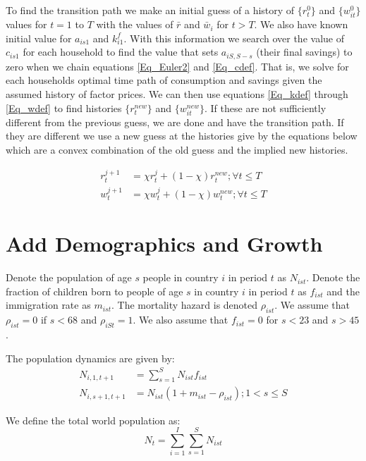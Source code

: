 \documentclass[letterpaper,12pt]{article}
\theoremstyle{definition}
\numberwithin{equation}{section}
\begin{document}
\begin{spacing}{1.5}
	To find the transition path we make an initial guess of a history of $\{r^0_t\}$ and $\{w^0_{it}\}$ values for $t=1$ to $T$ with the values of $\bar r$ and $\bar w_i$ for $t>T$.  We also have  known initial value for $a_{is1}$ and $k^f_{i1}$. With this information we search over the value of $c_{is1}$ for each household to find the value that sets $a_{iS,S-s}$ (their final savings) to zero when we chain equations \eqref{Eq_Euler2} and \eqref{Eq_cdef}.  That is, we solve for each households optimal time path of consumption and savings given the assumed history of factor prices.  We can then use equations \eqref{Eq_kdef} through \eqref{Eq_wdef} to find histories $\{r^{new}_t\}$ and $\{w^{new}_{it}\}$.  If these are not sufficiently different from the previous guess, we are done and have the transition path.  If they are different we use a new guess at the histories give by the equations below which are a convex combination of the old guess and the implied new histories.

	\begin{align}
		r^{j+1}_t & = \chi r^{j}_t + (1-\chi) r^{new}_t; \forall t \le T\\
		w^{j+1}_t & = \chi w^{j}_t + (1-\chi) w^{new}_t; \forall t \le T 
	\end{align}


\newpage
\section{Add Demographics and Growth}
	Denote the population of age $s$ people in country $i$ in period $t$ as $N_{ist}$.  Denote the fraction of children born to people of age $s$ in country $i$ in period $t$ as $f_{ist}$ and the immigration rate as $m_{ist}$.  The mortality hazard is denoted $\rho_{ist}$.  We assume that $\rho_{ist}=0$ if $s<68$ and $\rho_{iSt}=1$.  We also assume that $f_{ist} = 0$ for $s<23$ and $s>45$.

	The population dynamics are given by:
	\begin{align}
		N_{i,1,t+1} & = \sum_{s=1}^S N_{ist} f_{ist} \label{eq_2pop1}\\
		N_{i,s+1,t+1} & = N_{ist} (1+m_{ist}-\rho_{ist}); 1<s\le S \label{eq_2pop2}
	\end{align}

	We define the total world population as:
	\begin{equation}
		N_t = \sum_{i=1}^I \sum_{s=1}^S N_{ist}
	\end{equation}


\end{spacing}
\end{document}
